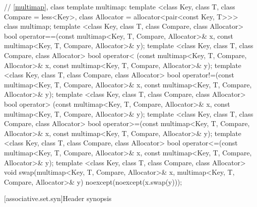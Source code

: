 \begin{codeblock}
{  // \ref{multimap}, class template multimap:
  template <class Key, class T, class Compare = less<Key>,
            class Allocator = allocator<pair<const Key, T>>>
    class multimap;
  template <class Key, class T, class Compare, class Allocator>
    bool operator==(const multimap<Key, T, Compare, Allocator>& x,
                    const multimap<Key, T, Compare, Allocator>& y);
  template <class Key, class T, class Compare, class Allocator>
    bool operator< (const multimap<Key, T, Compare, Allocator>& x,
                    const multimap<Key, T, Compare, Allocator>& y);
  template <class Key, class T, class Compare, class Allocator>
    bool operator!=(const multimap<Key, T, Compare, Allocator>& x,
                    const multimap<Key, T, Compare, Allocator>& y);
  template <class Key, class T, class Compare, class Allocator>
    bool operator> (const multimap<Key, T, Compare, Allocator>& x,
                    const multimap<Key, T, Compare, Allocator>& y);
  template <class Key, class T, class Compare, class Allocator>
    bool operator>=(const multimap<Key, T, Compare, Allocator>& x,
                    const multimap<Key, T, Compare, Allocator>& y);
  template <class Key, class T, class Compare, class Allocator>
    bool operator<=(const multimap<Key, T, Compare, Allocator>& x,
                    const multimap<Key, T, Compare, Allocator>& y);
  template <class Key, class T, class Compare, class Allocator>
    void swap(multimap<Key, T, Compare, Allocator>& x,
              multimap<Key, T, Compare, Allocator>& y)
      noexcept(noexcept(x.swap(y)));
}
\end{codeblock}

[associative.set.syn]{Header  synopsis}%

